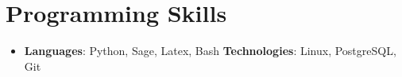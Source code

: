 \documentclass[letterpaper,11pt]{article}
\newcommand{\resumeSubHeadingListStart}{\begin{itemize}[leftmargin=*]}
\newcommand{\resumeSubHeadingListEnd}{\end{itemize}}
\begin{document}
\section{Programming Skills}
  \resumeSubHeadingListStart
    \item{
      \textbf{Languages}{: Python, Sage, Latex, Bash}
      \hfill
      \textbf{Technologies}{: Linux, PostgreSQL, Git}
    }
  \resumeSubHeadingListEnd


\end{document}
